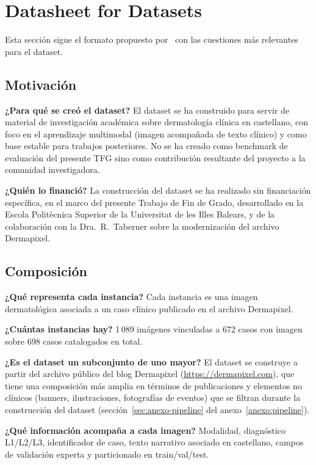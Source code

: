 \section{Datasheet for Datasets}
\label{sec:dataset-datasheet}

Esta sección sigue el formato propuesto por~\cite{datasheets2018}
con las cuestiones más relevantes para el dataset.

\subsection*{Motivación}

\textbf{¿Para qué se creó el dataset?} El dataset se ha construido
para servir de material de investigación académica sobre
dermatología clínica en castellano, con foco en el aprendizaje
multimodal (imagen acompañada de texto clínico) y como base
estable para trabajos posteriores. No se ha creado como benchmark
de evaluación del presente TFG sino como contribución resultante
del proyecto a la comunidad investigadora.

\textbf{¿Quién lo financió?} La construcción del dataset se ha
realizado sin financiación específica, en el marco del presente
Trabajo de Fin de Grado, desarrollado en la Escola Politècnica
Superior de la Universitat de les Illes Balears, y de la colaboración
con la Dra.~R.~Taberner sobre la modernización del archivo
Dermapixel.

\subsection*{Composición}

\textbf{¿Qué representa cada instancia?} Cada instancia es una
imagen dermatológica asociada a un caso clínico publicado en el
archivo Dermapixel.

\textbf{¿Cuántas instancias hay?} 1\,089 imágenes vinculadas a 672
casos con imagen sobre 698 casos catalogados en total.

\textbf{¿Es el dataset un subconjunto de uno mayor?} El dataset se
construye a partir del archivo público del blog Dermapixel
(\url{https://dermapixel.com}), que tiene una composición más amplia
en términos de publicaciones y elementos no clínicos (banners,
ilustraciones, fotografías de eventos) que se filtran durante la
construcción del dataset (sección~\ref{sec:anexo-pipeline} del
anexo~\ref{anexo:pipeline}).

\textbf{¿Qué información acompaña a cada imagen?} Modalidad,
diagnóstico L1/L2/L3, identificador de caso, texto narrativo
asociado en castellano, campos de validación experta y
particionado en train/val/test.

